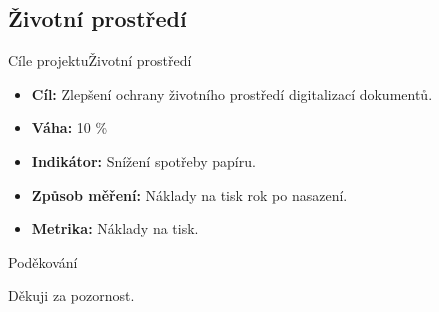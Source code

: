 \documentclass[10pt]{beamer}
\begin{document}
\subsection*{Životní prostředí}

\begin{frame}{Cíle projektu}{Životní prostředí}
	\begin{itemize}
		\item \textbf{Cíl:} Zlepšení ochrany životního prostředí digitalizací dokumentů.
		\item \textbf{Váha:} 10 \%
		\item \textbf{Indikátor:} Snížení spotřeby papíru.
		\item \textbf{Způsob měření:} Náklady na tisk rok po nasazení.
		\item \textbf{Metrika:} Náklady na tisk.
	\end{itemize}
\end{frame}

\begin{frame}{Poděkování}
	\begin{block}{Děkuji za pozornost.}
	\end{block}
\end{frame}
\end{document}
